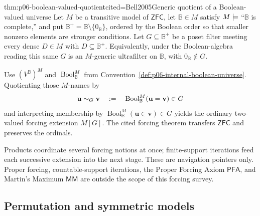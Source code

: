 \begin{hbtheorem}{thm:p06-boolean-valued-quotient}{cited=Bell2005}{Generic quotient of a Boolean-valued universe}
Let \(M\) be a transitive model of \(\mathsf{ZFC}\), let
\(\mathbb B\in M\) satisfy \(M\models\) “\(\mathbb B\) is complete,” and
put \(\mathbb B^+=\mathbb B\setminus\{0_{\mathbb B}\}\), ordered by the
Boolean order so that smaller nonzero elements are stronger conditions.
Let \(G\subseteq\mathbb B^+\) be a poset filter meeting every dense
\(D\in M\) with \(D\subseteq\mathbb B^+\).  Equivalently, under the
Boolean-algebra reading this same \(G\) is an \(M\)-generic ultrafilter on
\(\mathbb B\), with \(0_{\mathbb B}\notin G\).

Use \((V^{\mathbb B})^M\) and
\(\operatorname{Bool}_{\mathbb B}^M\) from
Convention~\ref{def:p06-internal-boolean-universe}.  Quotienting those
\(M\)-names by
\[
  \mathbf u\sim_G\mathbf v
  \quad\mathrel{:=}\quad
  \operatorname{Bool}_{\mathbb B}^M(\mathbf u=\mathbf v)\in G
\]
and interpreting membership by
\(\operatorname{Bool}_{\mathbb B}^M(\mathbf u\in\mathbf v)\in G\) yields the ordinary
two-valued forcing extension \(M[G]\).  The cited forcing theorem transfers
\(\mathsf{ZFC}\) and preserves the ordinals.
\end{hbtheorem}

Products coordinate several forcing notions at once; finite-support iterations
feed each successive extension into the next stage.  These are navigation
pointers only.  Proper forcing, countable-support iterations, the Proper
Forcing Axiom \(\mathsf{PFA}\), and Martin's Maximum \(\mathsf{MM}\) are
outside the scope of this forcing survey.

\subsection{Permutation and symmetric models}

